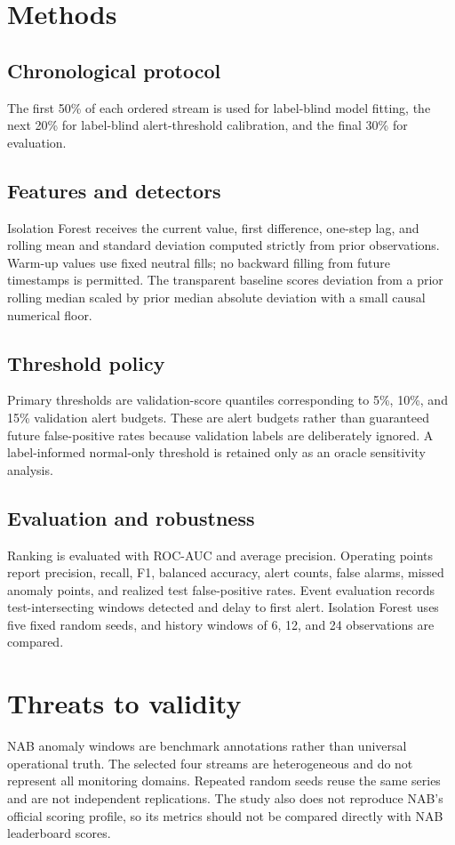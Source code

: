 \documentclass[11pt]{article}
\begin{document}
\section{Methods}
\subsection{Chronological protocol}
The first 50\% of each ordered stream is used for label-blind model fitting, the next 20\% for label-blind alert-threshold calibration, and the final 30\% for evaluation.

\subsection{Features and detectors}
Isolation Forest receives the current value, first difference, one-step lag, and rolling mean and standard deviation computed strictly from prior observations. Warm-up values use fixed neutral fills; no backward filling from future timestamps is permitted. The transparent baseline scores deviation from a prior rolling median scaled by prior median absolute deviation with a small causal numerical floor.

\subsection{Threshold policy}
Primary thresholds are validation-score quantiles corresponding to 5\%, 10\%, and 15\% validation alert budgets. These are alert budgets rather than guaranteed future false-positive rates because validation labels are deliberately ignored. A label-informed normal-only threshold is retained only as an oracle sensitivity analysis.

\subsection{Evaluation and robustness}
Ranking is evaluated with ROC-AUC and average precision. Operating points report precision, recall, F1, balanced accuracy, alert counts, false alarms, missed anomaly points, and realized test false-positive rates. Event evaluation records test-intersecting windows detected and delay to first alert. Isolation Forest uses five fixed random seeds, and history windows of 6, 12, and 24 observations are compared.



\section{Threats to validity}
NAB anomaly windows are benchmark annotations rather than universal operational truth. The selected four streams are heterogeneous and do not represent all monitoring domains. Repeated random seeds reuse the same series and are not independent replications. The study also does not reproduce NAB's official scoring profile, so its metrics should not be compared directly with NAB leaderboard scores.
\end{document}
